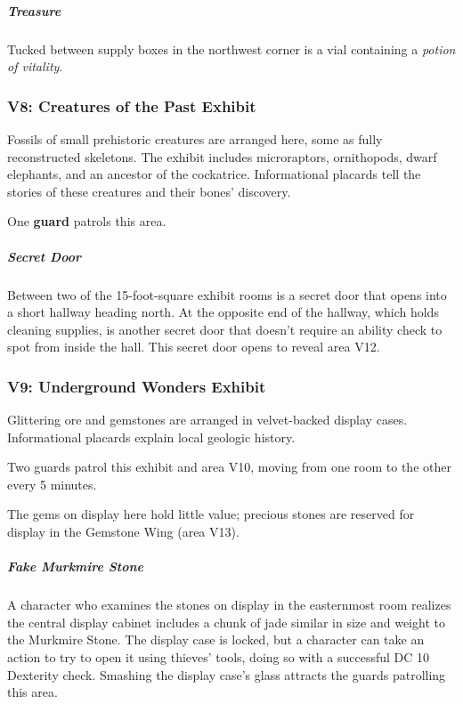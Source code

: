 \documentclass[10pt,a4paper,twoside,bg=print,twocolumn,openany,nodeprecatedcode]{dndbook}
\begin{document}
\subparagraph{Treasure}
Tucked between supply boxes in the northwest corner is a vial containing a \textit{potion of vitality}.

\subsubsection{V8: Creatures of the Past Exhibit}
\begin{DndReadAloud}{}
Fossils of small prehistoric creatures are arranged here, some as fully reconstructed skeletons. The exhibit includes microraptors, ornithopods, dwarf elephants, and an ancestor of the cockatrice. Informational placards tell the stories of these creatures and their bones' discovery.

\end{DndReadAloud}

One \textbf{guard} patrols this area.

\subparagraph{Secret Door}
Between two of the 15-foot-square exhibit rooms is a secret door that opens into a short hallway heading north. At the opposite end of the hallway, which holds cleaning supplies, is another secret door that doesn't require an ability check to spot from inside the hall. This secret door opens to reveal area V12.

\subsubsection{V9: Underground Wonders Exhibit}
\begin{DndReadAloud}{}
Glittering ore and gemstones are arranged in velvet-backed display cases. Informational placards explain local geologic history.

\end{DndReadAloud}

Two guards patrol this exhibit and area V10, moving from one room to the other every 5 minutes.

The gems on display here hold little value; precious stones are reserved for display in the Gemstone Wing (area V13).

\subparagraph{Fake Murkmire Stone}
A character who examines the stones on display in the easternmost room realizes the central display cabinet includes a chunk of jade similar in size and weight to the Murkmire Stone. The display case is locked, but a character can take an action to try to open it using thieves' tools, doing so with a successful DC 10 Dexterity check. Smashing the display case's glass attracts the guards patrolling this area.
\end{document}
